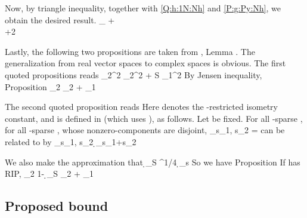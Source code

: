 Now, by triangle inequality, together with \eqref {Q:h:1N:Nh} and \eqref {P:g:Py:Nh}, we obtain the desired result.
%
 {
 _\infty
\leq {}
+  \\
%
  +2  
}

Lastly, the following two propositions are taken from \cite {CaT07}, Lemma .
The generalization from real vector spaces to complex spaces is obvious.
The first quoted propositions reads
%
 {
 _2^2
\leq {} _2^2 +  {S}  _1^2 
}
%
By Jensen inequality,
%
\Result
{Proposition}
{
%
 {
 _2
\leq {} _2 +  {}  _1 
}
}

The second quoted proposition reads
%
%
Here  denotes the -restricted isometry constant, and is defined in \cite {Can05} (which uses \m {\th}), as follows.
Let  be fixed.
For all -sparse , for all -sparse , whose nonzero-components are disjoint,
%
 {
\tilde {\d} _{s_1, s_2}
= \inf {} 
}
%
 can be related to  by \cite {Can05}
 {
\tilde {\d} _{s_1, s_2}
\leq \d_{s_1+s_2} 
}

We also make the approximation that
%
 {
\d_{S}
\leq {}  ^{1/4} \d_{s} 
}
%
So we have
%
\Result
{Proposition}
{
If  has  RIP,
%
 {
 _2
\leq {} {1-  \d_{S}}  _2
+  { }  _1 
}
}


\subsection {Proposed bound}

